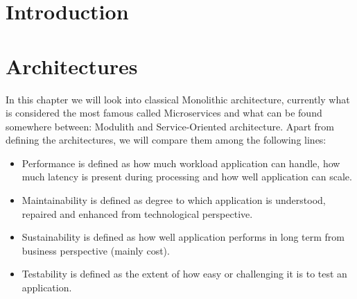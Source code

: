 \chapter*{Introduction}


\setcounter{page}{1}

\begin{chapterabstract}
    \lipsum[1]
\end{chapterabstract}

\lipsum[1]

\chapter{Architectures}
In this chapter we will look into classical Monolithic architecture, currently what is considered the most famous called Microservices and what can be found somewhere between: Modulith and Service-Oriented architecture. Apart from defining the architectures, we will compare them among the following lines:
\begin{itemize}
    \item Performance is defined as how much workload application can handle, how much latency is present during processing and how well application can scale.
    \item Maintainability is defined as degree to which application is understood, repaired and enhanced from technological perspective.  \cite{SOFTWARE_MAINTAINABILITY}
    \item Sustainability is defined as how well application performs in long term from business perspective (mainly cost).
    \item Testability is defined as the extent of how easy or challenging it is to test an application.
\end{itemize}

